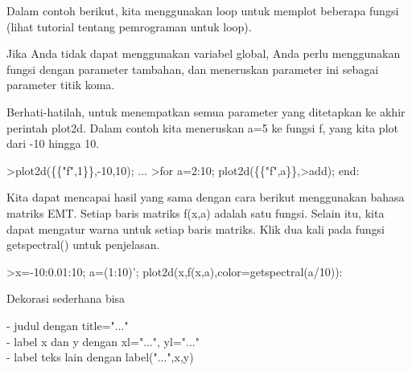 \documentclass[a4paper,10pt]{article}
\begin{document}
\begin{eulernotebook}
\begin{eulercomment}
\begin{eulercomment}
\begin{eulercomment}
\begin{eulercomment}
\begin{eulercomment}
Dalam contoh berikut, kita menggunakan loop untuk memplot beberapa
fungsi (lihat tutorial tentang pemrograman untuk loop).

Jika Anda tidak dapat menggunakan variabel global, Anda perlu
menggunakan fungsi dengan parameter tambahan, dan meneruskan parameter
ini sebagai parameter titik koma.

Berhati-hatilah, untuk menempatkan semua parameter yang ditetapkan ke
akhir perintah plot2d. Dalam contoh kita meneruskan a=5 ke fungsi f,
yang kita plot dari -10 hingga 10.
\end{eulercomment}
\begin{eulerprompt}
>plot2d(\{\{"f",1\}\},-10,10); ...
>for a=2:10; plot2d(\{\{"f",a\}\},>add); end:
\end{eulerprompt}
\begin{eulercomment}
Kita dapat mencapai hasil yang sama dengan cara berikut menggunakan
bahasa matriks EMT. Setiap baris matriks f(x,a) adalah satu fungsi.
Selain itu, kita dapat mengatur warna untuk setiap baris matriks. Klik
dua kali pada fungsi getspectral() untuk penjelasan.
\end{eulercomment}
\begin{eulerprompt}
>x=-10:0.01:10; a=(1:10)'; plot2d(x,f(x,a),color=getspectral(a/10)):
\end{eulerprompt}
\begin{eulercomment}
Dekorasi sederhana bisa

- judul dengan title="..."\\
- label x dan y dengan xl="...", yl="..."\\
- label teks lain dengan label("...",x,y)


\end{eulercomment}
\end{eulercomment}
\end{eulercomment}
\end{eulercomment}
\end{eulercomment}
\end{eulernotebook}
\end{document}
